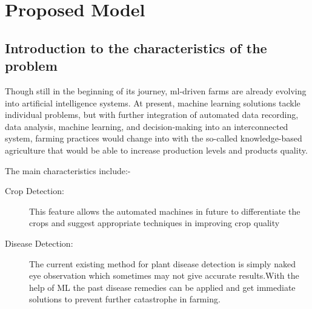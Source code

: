\documentclass[../Report.tex]{subfiles}
\begin{document}
\chapter{Proposed Model}

\section{Introduction to the characteristics of the problem}
Though still in the beginning of its journey, \acrshort{ml}-driven farms are already evolving into artificial intelligence systems.
At present, machine learning solutions tackle individual problems, but with further integration of automated data recording,
data analysis, machine learning, and decision-making into an interconnected system, farming practices would change into with
the so-called knowledge-based agriculture that would be able to increase production levels and products quality. \par

The main characteristics include:-

\begin{description}
  \item[Crop Detection: ] This feature allows the automated machines in future to differentiate the crops and suggest appropriate 
  techniques in improving crop quality
  \item[Disease Detection: ] The current existing method for plant disease detection is simply naked eye observation which sometimes may not 
  give accurate results.With the help of ML the past disease remedies can be applied  and get immediate solutions to prevent further catastrophe
  in farming.
\end{description}
\end{document}
